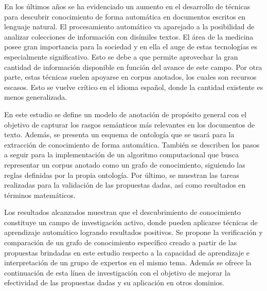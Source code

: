 \label{chapter:abstract_spanish}

En los últimos años se ha evidenciado un aumento en el desarrollo de técnicas para descubrir conocimiento de forma automática en documentos escritos en lenguaje natural. El procesamiento automático va aparejado a la posibilidad de analizar colecciones de información con disímiles textos. El área de la medicina posee gran importancia para la sociedad y en ella el auge de estas tecnologías es especialmente significativo. Esto se debe a que permite aprovechar la gran cantidad de información disponible en función del avance de este campo. Por otra parte, estas técnicas suelen apoyarse en corpus anotados, los cuales son recursos escasos. Esto se vuelve crítico en el idioma español, donde la cantidad existente es menos generalizada.

En este estudio se define un modelo de anotación de propósito general con el objetivo de capturar los rasgos semánticos más relevantes en los documentos de texto. Además, se presenta un esquema de ontología que se usará para la extracción de conocimiento de forma automática. También se describen los pasos a seguir para la implementación de un algoritmo computacional que busca representar un corpus anotado como un grafo de conocimiento, siguiendo las reglas definidas por la propia ontología. Por último, se muestran las tareas realizadas para la validación de las propuestas dadas, así como resultados en términos matemáticos.

Los resultados alcanzados muestran que el descubrimiento de conocimiento constituye un campo de investigación activo, donde pueden aplicarse técnicas de aprendizaje automático logrando resultados positivos. Se propone la verificación y comparación de un grafo de conocimiento específico creado a partir de las propuestas brindadas en este estudio respecto a la capacidad de aprendizaje e interpretación de un grupo de expertos en el mismo tema. Además se ofrece la continuación de esta línea de investigación con el objetivo de mejorar la efectividad de las propuestas dadas y su aplicación en otros dominios.